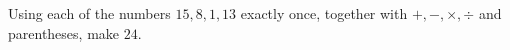 Using each of the numbers $15,8,1,13$ exactly once, together with $+,-,\times,\div$ and parentheses, make $24$.
